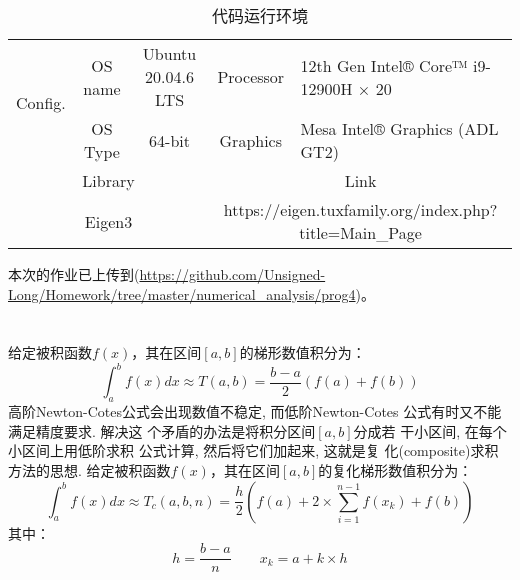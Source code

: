 \documentclass[12pt, onecolumn]{article}
\newcommand\normf{\fangsong}
\begin{document}
		\begin{table}[h]
		\centering
		\caption{\normf 代码运行环境}
		\label{tab:代码运行环境}
		\vspace{2mm}
		\begin{tabular}{ccc|cl}
		\toprule
		\multicolumn{1}{c|}{\multirow{2}{*}{Config.}} & OS name & Ubuntu 20.04.6 LTS & Processor              & 12th Gen Intel® Core™ i9-12900H × 20              \\ \cmidrule{2-5} 
		\multicolumn{1}{c|}{}                         & OS Type & 64-bit             & Graphics               & Mesa Intel® Graphics (ADL GT2)                    \\ \midrule[1pt]\midrule[1pt]
		\multicolumn{3}{c|}{Library}                                                 & \multicolumn{2}{c}{Link}                                                   \\ \midrule
		\multicolumn{3}{c|}{Eigen3}                                                  & \multicolumn{2}{c}{https://eigen.tuxfamily.org/index.php?title=Main\_Page}              \\ \bottomrule
		\end{tabular}
		\end{table}
		
		本次的作业已上传到(\url{https://github.com/Unsigned-Long/Homework/tree/master/numerical_analysis/prog4})。
		
	\section{\normf{复化梯形求积公式}}
	给定被积函数$f(x)$，其在区间$[a,b]$的梯形数值积分为：
	\begin{equation}
	\int_{a}^{b}f(x)dx\approx T(a,b)=\frac{b-a}{2}\left(
	f(a)+f(b)
	\right) 
	\end{equation}
	高阶Newton-Cotes公式会出现数值不稳定, 而低阶Newton-Cotes
	公式有时又不能满足精度要求. 解决这
	个矛盾的办法是将积分区间$[a,b]$分成若
	干小区间, 在每个小区间上用低阶求积
	公式计算, 然后将它们加起来, 这就是复
	化(composite)求积方法的思想.
	给定被积函数$f(x)$，其在区间$[a,b]$的复化梯形数值积分为：
	\begin{equation}
	\int_{a}^{b}f(x)dx\approx T_c(a,b,n)=\frac{h}{2}\left( f(a)+2\times\sum_{i=1}^{n-1}f(x_k)+f(b)\right)
	\end{equation}
	其中：
	\begin{equation}
		h=\frac{b-a}{n}\qquad
		x_k=a+k\times h
	\end{equation}
	
\end{document}
